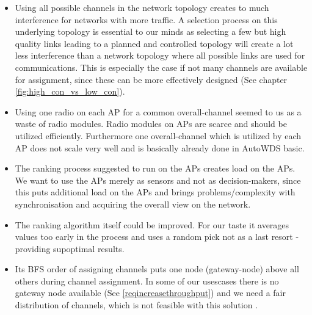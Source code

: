     \begin{itemize}
      \item Using all possible channels in the network topology creates to much interference for networks with more traffic.
	A selection process on this underlying topology is essential to our minds as selecting a few but high quality links
	leading to a planned and controlled topology will create a lot less interference than a network topology where all possible 
	links are used for communications. This is especially the case if not many channels are available for assignment, since 
	these can be more effectively designed (See chapter \ref{fig:high_con_vs_low_con}).
	\label{topologypreservingdealbreaker}
	
      \item Using one radio on each \ac{AP} for a common overall-channel seemed to us as a waste of radio modules.
	Radio modules on APs are scarce and should be utilized efficiently. 
	Furthermore one overall-channel which is utilized by each \ac{AP} does not scale very well and is basically already done in AutoWDS basic.
	
      \item The ranking process suggested to run on the APs creates load on the APs.
	We want to use the APs merely as sensors and not as decision-makers, 
	since this puts additional load on the APs and brings problems/complexity with synchronisation and
	acquiring the overall view on the network.
	
      \item The ranking algorithm itself could be improved. 
	For our taste it averages values too early in the process and uses a random pick not as a last resort - providing supoptimal results.
	
      \item Its \ac{BFS} order of assigning channels puts one node (gateway-node) above all others during channel assignment.
	In some of our usescases there is no gateway node available (See \ref{reqincreasethroughput}) and we need a fair distribution of channels, 
	which is not feasible with this solution \cite{overview_caa}.
    \end{itemize}


